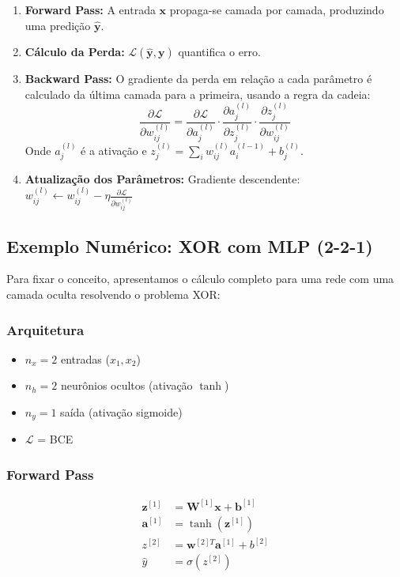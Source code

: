 \begin{enumerate}
  \item \textbf{Forward Pass:} A entrada $\mathbf{x}$ propaga-se camada por camada,
        produzindo uma predição $\mathbf{\hat{y}}$.
  \item \textbf{Cálculo da Perda:} $\mathcal{L}(\mathbf{\hat{y}}, \mathbf{y})$
        quantifica o erro.
  \item \textbf{Backward Pass:} O gradiente da perda em relação a cada parâmetro é
        calculado da última camada para a primeira, usando a regra da cadeia:
        \begin{equation}
          \frac{\partial \mathcal{L}}{\partial w_{ij}^{(l)}} =
          \frac{\partial \mathcal{L}}{\partial a_j^{(l)}} \cdot
          \frac{\partial a_j^{(l)}}{\partial z_j^{(l)}} \cdot
          \frac{\partial z_j^{(l)}}{\partial w_{ij}^{(l)}}
          \label{eq:chain-rule}
        \end{equation}
        Onde $a_j^{(l)}$ é a ativação e $z_j^{(l)} = \sum_i w_{ij}^{(l)} a_i^{(l-1)} + b_j^{(l)}$.
  \item \textbf{Atualização dos Parâmetros:} Gradiente descendente:
        $w_{ij}^{(l)} \leftarrow w_{ij}^{(l)} - \eta \frac{\partial \mathcal{L}}{\partial w_{ij}^{(l)}}$
\end{enumerate}

\subsection{Exemplo Numérico: XOR com MLP (2-2-1)}

Para fixar o conceito, apresentamos o cálculo completo para uma rede com uma camada
oculta resolvendo o problema XOR:

\subsubsection*{Arquitetura}
\begin{itemize}
  \item $n_x = 2$ entradas ($x_1, x_2$)
  \item $n_h = 2$ neurônios ocultos (ativação $\tanh$)
  \item $n_y = 1$ saída (ativação sigmoide)
  \item $\mathcal{L}$ = BCE
\end{itemize}

\subsubsection*{Forward Pass}
\begin{align}
  \mathbf{z}^{[1]} &= \mathbf{W}^{[1]}\mathbf{x} + \mathbf{b}^{[1]} \label{eq:fwd1} \\
  \mathbf{a}^{[1]} &= \tanh(\mathbf{z}^{[1]}) \label{eq:fwd2} \\
  z^{[2]} &= \mathbf{w}^{[2]T}\mathbf{a}^{[1]} + b^{[2]} \label{eq:fwd3} \\
  \hat{y} &= \sigma(z^{[2]}) \label{eq:fwd4}
\end{align}

